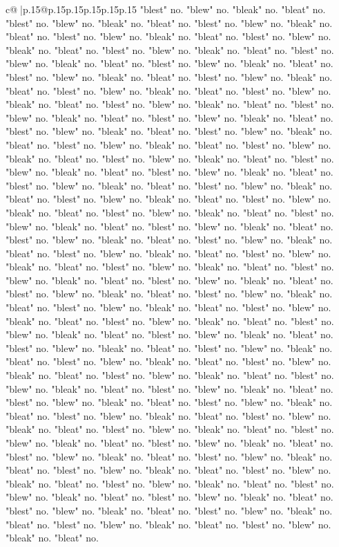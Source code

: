 \documentclass{article}
\begin{document}
{\begin{supertabular}{c@{$\;$}|p{.15\linewidth}@{}p{.15\linewidth}p{.15\linewidth}p{.15\linewidth}p{.15\linewidth}p{.15\linewidth}}
{{{"blest" no. "blew" no. "bleak" no. "bleat" no. "blest" no. "blew" no. "bleak" no. "bleat" no. "blest" no. "blew" no. "bleak" no. "bleat" no. "blest" no. "blew" no. "bleak" no. "bleat" no. "blest" no. "blew" no. "bleak" no. "bleat" no. "blest" no. "blew" no. "bleak" no. "bleat" no. "blest" no. "blew" no. "bleak" no. "bleat" no. "blest" no. "blew" no. "bleak" no. "bleat" no. "blest" no. "blew" no. "bleak" no. "bleat" no. "blest" no. "blew" no. "bleak" no. "bleat" no. "blest" no. "blew" no. "bleak" no. "bleat" no. "blest" no. "blew" no. "bleak" no. "bleat" no. "blest" no. "blew" no. "bleak" no. "bleat" no. "blest" no. "blew" no. "bleak" no. "bleat" no. "blest" no. "blew" no. "bleak" no. "bleat" no. "blest" no. "blew" no. "bleak" no. "bleat" no. "blest" no. "blew" no. "bleak" no. "bleat" no. "blest" no. "blew" no. "bleak" no. "bleat" no. "blest" no. "blew" no. "bleak" no. "bleat" no. "blest" no. "blew" no. "bleak" no. "bleat" no. "blest" no. "blew" no. "bleak" no. "bleat" no. "blest" no. "blew" no. "bleak" no. "bleat" no. "blest" no. "blew" no. "bleak" no. "bleat" no. "blest" no. "blew" no. "bleak" no. "bleat" no. "blest" no. "blew" no. "bleak" no. "bleat" no. "blest" no. "blew" no. "bleak" no. "bleat" no. "blest" no. "blew" no. "bleak" no. "bleat" no. "blest" no. "blew" no. "bleak" no. "bleat" no. "blest" no. "blew" no. "bleak" no. "bleat" no. "blest" no. "blew" no. "bleak" no. "bleat" no. "blest" no. "blew" no. "bleak" no. "bleat" no. "blest" no. "blew" no. "bleak" no. "bleat" no. "blest" no. "blew" no. "bleak" no. "bleat" no. "blest" no. "blew" no. "bleak" no. "bleat" no. "blest" no. "blew" no. "bleak" no. "bleat" no. "blest" no. "blew" no. "bleak" no. "bleat" no. "blest" no. "blew" no. "bleak" no. "bleat" no. "blest" no. "blew" no. "bleak" no. "bleat" no. "blest" no. "blew" no. "bleak" no. "bleat" no. "blest" no. "blew" no. "bleak" no. "bleat" no. "blest" no. "blew" no. "bleak" no. "bleat" no. "blest" no. "blew" no. "bleak" no. "bleat" no. "blest" no. "blew" no. "bleak" no. "bleat" no. "blest" no. "blew" no. "bleak" no. "bleat" no. "blest" no. "blew" no. "bleak" no. "bleat" no. "blest" no. "blew" no. "bleak" no. "bleat" no. "blest" no. "blew" no. "bleak" no. "bleat" no. "blest" no. "blew" no. "bleak" no. "bleat" no. "blest" no. "blew" no. "bleak" no. "bleat" no. "blest" no. "blew" no. "bleak" no. "bleat" no. "blest" no. "blew" no. "bleak" no. "bleat" no. "blest" no. "blew" no. "bleak" no. "bleat" no. "blest" no. "blew" no. "bleak" no. "bleat" no. "blest" no. "blew" no. "bleak" no. "bleat" no. "blest" no. "blew" no. "bleak" no. "bleat" no. "blest" no. "blew" no. "bleak" no. "bleat" no. "blest" no. "blew" no. "bleak" no. "bleat" no. "blest" no. "blew" no. "bleak" no. "bleat" no. "blest" no. "blew" no. "bleak" no. "bleat" no. "blest" no. "blew" no. "bleak" no. "bleat" no. "blest" no. "blew" no. "bleak" no. "bleat" no. "blest" no. "blew" no. "bleak" no. "bleat" no. "blest" no. "blew" no. "bleak" no. "bleat" no. "blest" no. "blew" no. "bleak" no. "bleat" no. "blest" no. "blew" no. "bleak" no. "bleat" no. "blest" no. "blew" no. "bleak" no. "bleat" no. "blest" no. "blew" no. "bleak" no. "bleat" no. "blest" no. "blew" no. "bleak" no. "bleat" no. }}}
\end{supertabular}}
\end{document}

